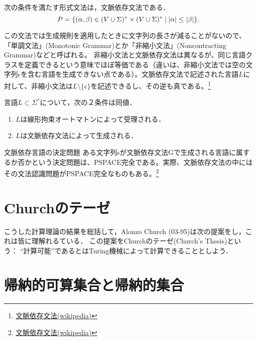 \documentclass[uplatex, dvipdfmx]{jsreport}
\begin{document}
\begin{proposition}[文脈依存文法の特徴付け]
    次の条件を満たす形式文法は，文脈依存文法である．
    \[P=\{(\alpha,\beta)\in(V\cup\Sigma)^*\times(V\cup\Sigma)^*\mid\lvert\alpha\rvert\le\lvert\beta\rvert\}.\]
\end{proposition}
\begin{remark}
    この文法では生成規則を適用したときに文字列の長さが減ることがないので、「単調文法」(Monotonic Grammar)とか「非縮小文法」(Noncontracting Grammar)などと呼ばれる。
    非縮小文法と文脈依存文法は異なるが、同じ言語クラスを定義できるという意味でほぼ等価である（違いは、非縮小文法では空の文字列$\epsilon$を含む言語を生成できない点である）。文脈依存文法で記述された言語$L$に対して、非縮小文法は$L\setminus\{\epsilon\}$を記述できるし、その逆も真である。\footnote{\href{https://ja.wikipedia.org/wiki/文脈依存文法}{文脈依存文法(wikipedia)}}
\end{remark}

\begin{theorem}
    言語$L\subset\Sigma^*$について，次の２条件は同値．
    \begin{enumerate}
        \item $L$は線形拘束オートマトンによって受理される．
        \item $L$は文脈依存文法によって生成される．
    \end{enumerate}
\end{theorem}

\begin{itembox}[l]{文脈依存言語の決定問題}
    ある文字列sが文脈依存文法Gで生成される言語に属するか否かという決定問題は、PSPACE完全である。実際、文脈依存文法の中にはその文法認識問題がPSPACE完全なものもある。\footnote{\href{https://ja.wikipedia.org/wiki/文脈依存文法}{文脈依存文法(wikipedia)}}
\end{itembox}

\section{Churchのテーゼ}

\begin{tcolorbox}[colframe=ForestGreen, colback=ForestGreen!10!white, breakable]
    こうした計算理論の結果を総括して，Alonzo Church (03-95)は次の提案をし，これは皆に理解れるている．
    この提案をChurchのテーゼ(Church's Thesis)という：
    “計算可能”であるとはTuring機械によって計算できることとしよう．
\end{tcolorbox}

\section{帰納的可算集合と帰納的集合}
\end{document}
